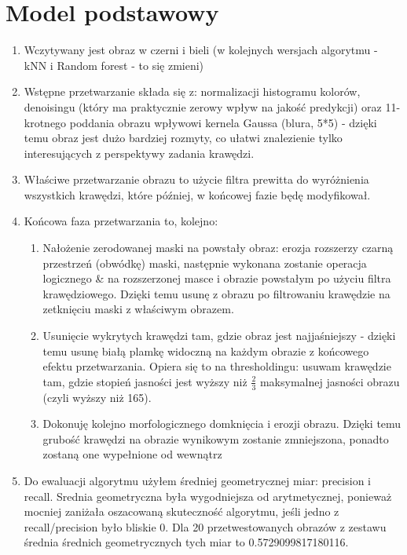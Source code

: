 \documentclass[12pt]{article}
\begin{document}
\section{Model podstawowy}
\begin {enumerate}
	\item Wczytywany jest obraz w czerni i bieli (w kolejnych wersjach algorytmu - kNN i Random forest - to się zmieni)
	\item Wstępne przetwarzanie składa się z: normalizacji histogramu kolorów, denoisingu (który ma praktycznie zerowy wpływ na jakość predykcji) oraz 11-krotnego poddania obrazu wpływowi kernela Gaussa (blura, 5*5) - dzięki temu obraz jest dużo bardziej rozmyty, co ułatwi znalezienie tylko interesujących z perspektywy zadania krawędzi.
	\item Właściwe przetwarzanie obrazu to użycie filtra prewitta do wyróżnienia wszystkich krawędzi, które później, w końcowej fazie będę modyfikował.
	\item Końcowa faza przetwarzania to, kolejno:
	\begin{enumerate}
		\item Nałożenie zerodowanej maski na powstały obraz: erozja rozszerzy czarną przestrzeń (obwódkę) maski, następnie wykonana zostanie operacja logicznego \& na rozszerzonej masce i obrazie powstałym po użyciu filtra krawędziowego. Dzięki temu usunę z obrazu po filtrowaniu krawędzie na zetknięciu maski z właściwym obrazem.
		\item Usunięcie wykrytych krawędzi tam, gdzie obraz jest najjaśniejszy - dzięki temu usunę białą plamkę widoczną na każdym obrazie z końcowego efektu przetwarzania. Opiera się to na thresholdingu: usuwam krawędzie tam, gdzie stopień jasności jest wyższy niż \(\frac{2}{3}\) maksymalnej jasności obrazu (czyli wyższy niż 165).
		\item Dokonuję kolejno morfologicznego domknięcia i erozji obrazu. Dzięki temu grubość krawędzi na obrazie wynikowym zostanie zmniejszona, ponadto zostaną one wypełnione od wewnątrz
	\end{enumerate}
	\item Do ewaluacji algorytmu użyłem średniej geometrycznej miar: precision i recall. Srednia geometryczna była wygodniejsza od arytmetycznej, ponieważ mocniej zaniżała oszacowaną skuteczność algorytmu, jeśli jedno z recall/precision było bliskie 0. Dla 20 przetwestowanych obrazów z zestawu średnia średnich geometrycznych tych miar to 0.5729099817180116.
\end {enumerate}
\end{document}
